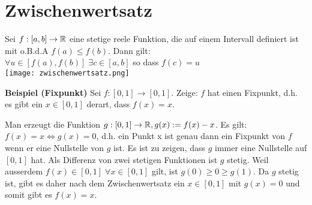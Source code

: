 \section{Zwischenwertsatz}
Sei $f: [a,b] \to \mathbb{R}$ eine stetige reele Funktion, die auf einem Intervall
definiert ist mit o.B.d.A $f(a) \leq f(b)$. Dann gilt:\\
{\small $\forall u \in [f(a), f(b)] \; \exists c \in [a, b]$ so dass $f(c) = u$} \\
\vspace{-0.2cm}
\hspace{5.cm}\texttt{[image: zwischenwertsatz.png]}

\vspace{0cm}
\textbf{Beispiel (Fixpunkt)}
Sei $f: [0,1] \to [0,1]$. Zeige: $f$ hat einen Fixpunkt, d.h. es gibt ein $x
\in [0,1]$ derart, dass $f(x) = x$.

Man erzeugt die Funktion $g: [0,1] \to \mathbb{R}, g(x) := f(x) - x$. Es gilt: $f(x) =
x \Leftrightarrow g(x) = 0$, d.h. ein Punkt x ist genau dann ein Fixpunkt von
$f$ wenn er eine Nullstelle von $g$ ist. Es ist zu zeigen, dass $g$ immer eine
Nullstelle auf $[0,1]$ hat. Als Differenz von zwei stetigen Funktionen ist $g$
stetig. Weil ausserdem $f(x) \in [0,1] \; \forall x \in [0,1]$ gilt, ist $g(0)
\geq 0 \geq g(1)$. Da $g$ stetig ist, gibt es daher nach dem Zwischenwertsatz
ein $x \in [0,1]$ mit $g(x) = 0$ und somit gibt es $f(x) = x$.
